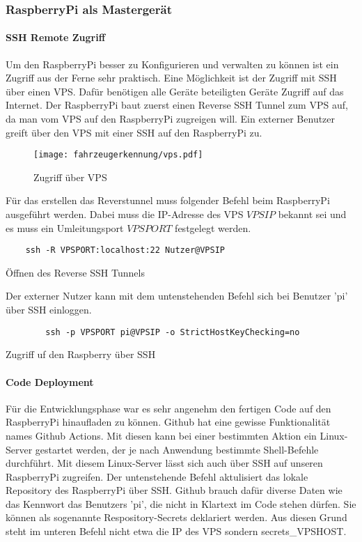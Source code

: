 \subsubsection{RaspberryPi als Mastergerät}
\paragraph{SSH Remote Zugriff} \mbox{} 

Um den RaspberryPi besser zu Konfigurieren und verwalten zu können ist ein Zugriff aus der Ferne sehr praktisch. Eine Möglichkeit ist der Zugriff mit SSH über einen VPS. Dafür benötigen alle Geräte beteiligten Geräte Zugriff auf das Internet.
Der RaspberryPi baut zuerst einen Reverse SSH Tunnel zum VPS auf, da man vom VPS auf den RaspberryPi zugreigen will. Ein externer Benutzer greift über den VPS mit einer SSH auf den RaspberryPi zu.

\begin{figure}[H]
    \centering
    \texttt{[image: fahrzeugerkennung/vps.pdf]}
    \caption{Zugriff über VPS}
\end{figure}
Für das erstellen das Reverstunnel muss folgender Befehl beim RaspberryPi ausgeführt werden. Dabei muss die IP-Adresse des VPS $VPSIP$ bekannt sei und es muss ein Umleitungsport $VPSPORT$ festgelegt werden.
\begin{listing}[H]
    \begin{verbatim}
    ssh -R VPSPORT:localhost:22 Nutzer@VPSIP
    \end{verbatim}
    \caption{Öffnen des Reverse SSH Tunnels}
\end{listing}

Der externer Nutzer kann mit dem untenstehenden Befehl sich bei Benutzer 'pi' über SSH einloggen.

\begin{listing}[H]
    \begin{verbatim}
        ssh -p VPSPORT pi@VPSIP -o StrictHostKeyChecking=no
    \end{verbatim}
    \caption{Zugriff uf den Raspberry über SSH}
\end{listing}




\paragraph{Code Deployment} \mbox{} 

Für die Entwicklungsphase war es sehr angenehm den fertigen Code auf den RaspberryPi hinaufladen zu können. Github hat eine gewisse Funktionalität names Github Actions. Mit diesen kann bei einer bestimmten Aktion ein Linux-Server gestartet werden, der je nach
Anwendung bestimmte Shell-Befehle durchführt. Mit diesem Linux-Server lässt sich auch über SSH auf unseren RaspberryPi zugreifen. Der untenstehende Befehl aktulisiert das lokale Repository des RaspberryPi über SSH. Github brauch dafür diverse Daten wie das Kennwort
das Benutzers 'pi', die nicht in Klartext im Code stehen dürfen. Sie können als sogenannte Respository-Secrets deklariert werden. Aus diesen Grund steht im unteren Befehl nicht etwa die IP des VPS sondern secrets\_VPSHOST.  

